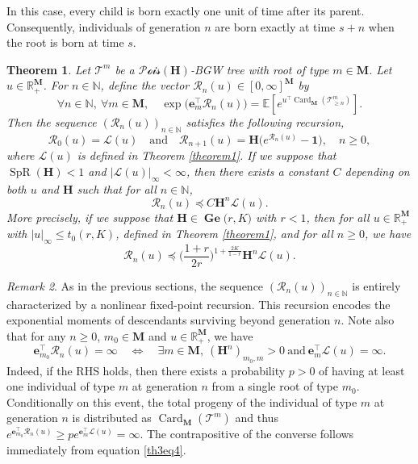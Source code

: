 \documentclass[reqno,final,11pt]{amsart}
\theoremstyle{plain}
\newtheorem{theorem}{Theorem}[section]
\theoremstyle{definition}
\theoremstyle{remark}
\newtheorem{remark}[theorem]{Remark}
\newcommand{\R}{\mathds{R}}
\newcommand{\N}{\mathds{N}}
\newcommand{\E}[1]{\mathds{E}\left[#1\right]}
\newcommand{\M}{\bm{M}}
\newcommand{\Ge}[2]{\bm{\Gel(} #1,#2 \bm{)} }
\newcommand{\T}{\mathcal{T}}
\renewcommand{\L}{\bm{\mathscr{L}}}
\newcommand{\ones}{\bm{1}}
\newcommand{\e}{\bm{e}}
\renewcommand{\H}{\bm{H}}
\renewcommand{\Re}{\bm{\mathscr{R}}}
\newcommand{\pos}{\R_+^{\M}}
\newcommand{\Pois}{\mathscr{P}\!\mathscr{o}\!\mathscr{i}\!\mathscr{s}}
\newcommand{\trp}{^{\intercal}}
\DeclareMathOperator{\card}{Card}
\DeclareMathOperator{\spr}{SpR}
\DeclareMathOperator{\Gel}{Ge}
\begin{document}
In this case, every child is born exactly one unit of time after its parent. Consequently, individuals of generation $n$ are born exactly at time $s+n$ when the root is born at time $s$.

\begin{theorem}\label{theorem3}
    Let $\T^{m}$ be a $\Pois(\H)$-BGW tree with root of type $m\in\M$. Let $u\in\pos $. For $n\in\N$, define the vector $\Re_n(u)\in [0,\infty]^{\M}$ by
    \begin{equation}\label{th3eq1}
        \forall n\in\N, \ \forall m\in\M, \quad \exp\big( \e_{m}\trp \Re_n(u)\big) = \E{e^{u\trp \card_{\M}(\T^{m}_{\geq n})}}.
    \end{equation}
    Then the sequence $(\Re_n(u))_{n\in\N}$ satisfies the following recursion,
    \begin{equation}\label{th3eq2}
        \Re_0(u) = \L(u) \quad \text{and} \quad \Re_{n+1}(u) = \H \big(e^{\Re_{n}(u)}-\ones\big), \quad n\geq 0,
    \end{equation}
    where $\L(u)$ is defined in Theorem \ref{theorem1}. If we suppose that $\spr(\H)<1$ and $\vert \L(u)\vert_{\infty} < \infty$, then there exists a constant $C$ depending on both $u$ and $\H$ such that for all $n\in\N$,
    \begin{equation}\label{th3eq4}
    	\Re_n(u) \preceq C \H^n \L(u).
    \end{equation}
    More precisely, if we suppose that $\H\in\Ge{r}{K}$ with $r<1$, then for all $u\in\pos$ with $\vert u\vert_{\infty} \leq t_0(r,K)$, defined in Theorem \ref{theorem1}, and for all $n\geq 0$, we have
    \begin{equation}\label{th3eq5}
        \Re_n(u) \preceq \Big(\frac{1+r}{2r}\Big)^{1+\frac{2K}{1-r}} \H^n \L(u).
    \end{equation}
\end{theorem}

\begin{remark}
	As in the previous sections, the sequence $(\Re_n(u))_{n\in\N}$ is entirely characterized by a nonlinear fixed-point recursion. This recursion encodes the exponential moments of descendants surviving beyond generation $n$. Note also that for any $n\geq 0$, $m_0\in\M$ and $u\in\pos$, we have
    \begin{equation*}
    	\e_{m_0}\trp \Re_n(u) = \infty \quad \iff \quad \exists m\in\M, \ (\H^n)_{m_0,m} >0 \ \text{and} \ \e_m\trp\L(u) = \infty.
    \end{equation*}
    Indeed, if the RHS holds, then there exists a probability $p>0$ of having at least one individual of type $m$ at generation $n$ from a single root of type $m_0$. Conditionally on this event, the total progeny of the individual of type $m$ at generation $n$ is distributed as $\card_{\M}(\T^{m})$ and thus $e^{\e_{m_0}\trp\Re_n(u)} \geq p e^{ \e_m\trp\L(u)} = \infty$. The contrapositive of the converse follows immediately from equation \eqref{th3eq4}.
\end{remark}
\end{document}
